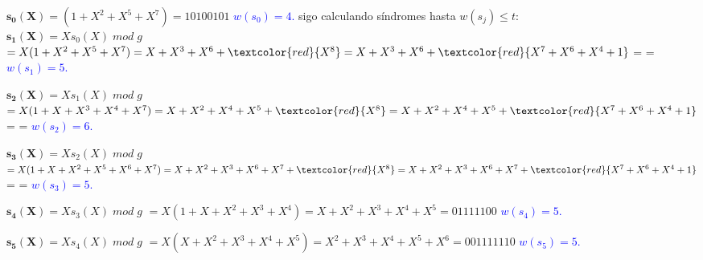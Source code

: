 \documentclass{beamer}
\theoremstyle{plain}
\theoremstyle{example}
\theoremstyle{example}
\begin{document}
\begin{frame}  \footnotesize  

$\mathbf{s_0(X)} =  (1+X^2+X^5+X^7) = \boxed{10100101}$ \textcolor{blue}{$w(s_0) = 4.$}
sigo calculando síndromes hasta $w(s_j)\leq t$:\\
\vspace{0.3cm}
$\mathbf{s_1(X)}= X s_0 (X) \; mod \; g$
$=X(1+X^2+X^5+X^7)= X+X^3+X^6+\textcolor{red}{X^8} =  X+X^3+X^6+\textcolor{red}{X^7+X^6+X^4+1}$ =  =  \textcolor{blue}{$w(s_1) = 5.$}

\vspace{0.3cm}
$\mathbf{s_2(X)}= X s_1 (X) \; mod \; g$
$=X(1+X+X^3+X^4+X^7)= X+X^2+X^4+X^5+\textcolor{red}{X^8} =  X+X^2+X^4+X^5+\textcolor{red}{X^7+X^6+X^4+1}$ =  = \textcolor{blue}{$w(s_2) = 6.$}

\vspace{0.3cm}
$\mathbf{s_3(X)}= X s_2 (X) \; mod \; g$
$=X(1+X+X^2+X^5+X^6+X^7)= X+X^2+X^3+X^6+X^7+\textcolor{red}{X^8} =  X+X^2+X^3+X^6+X^7+\textcolor{red}{X^7+X^6+X^4+1}$ =  =  \textcolor{blue}{$w(s_3) = 5.$}

\vspace{0.3cm}
$\mathbf{s_4(X)}= X s_3 (X) \; mod \; g$
$=X(1+X+X^2+X^3+X^4)= \boxed{X+X^2+X^3+X^4+X^5} =  \boxed{01111100}$ \textcolor{blue}{$w(s_4) = 5.$}

\vspace{0.3cm}
$\mathbf{s_5(X)}= X s_4 (X) \; mod \; g$
$=X(X+X^2+X^3+X^4+X^5)= \boxed{X^2+X^3+X^4+X^5+X^6} =  \boxed{001111110}$ \textcolor{blue}{$w(s_5) = 5.$}

\end{frame} 
\end{document}
